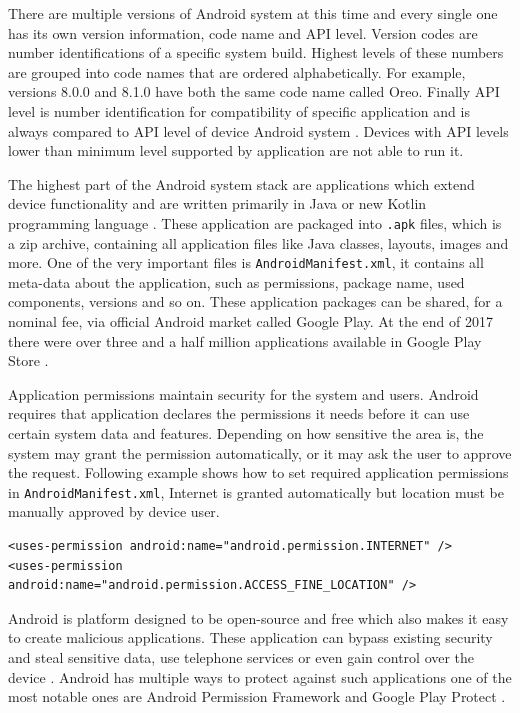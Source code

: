There are multiple versions of Android system at this time and every single one has its own version information, code name and API level. Version codes are number identifications of a specific system build. Highest levels of these numbers are grouped into code names that are ordered alphabetically. For example, versions 8.0.0 and 8.1.0 have both the same code name called Oreo. Finally API level is number identification for compatibility of specific application and is always compared to API level of device Android system \cite{AOSP, AD}. Devices with API levels lower than minimum level supported by application are not able to run it.

The highest part of the Android system stack are applications which extend device functionality and are written primarily in Java or new Kotlin programming language \cite{SoASTaD}. These application are packaged into \verb|.apk| files, which is a zip archive, containing all application files like Java classes, layouts, images and more. One of the very important files is \verb|AndroidManifest.xml|, it contains all meta-data about the application, such as permissions, package name, used components, versions and so on. These application packages can be shared, for a nominal fee, via official Android market called Google Play. At the end of 2017 there were over three and a half million applications available in Google Play Store \cite{SoASTaD, NoAAiGPS, NoAA}.

Application permissions maintain security for the system and users. Android requires that application declares the permissions it needs before it can use certain system data and features. Depending on how sensitive the area is, the system may grant the permission automatically, or it may ask the user to approve the request. Following example shows how to set required application permissions in \verb|AndroidManifest.xml|, Internet is granted automatically but location must be manually approved by device user.

\begin{lstlisting}[caption=Application permission settings]
<uses-permission android:name="android.permission.INTERNET" />
<uses-permission android:name="android.permission.ACCESS_FINE_LOCATION" />
\end{lstlisting}

Android is platform designed to be open-source and free which also makes it easy to create malicious applications. These application can bypass existing security and steal sensitive data, use telephone services or even gain control over the device \cite{ASIMPD}. Android has multiple ways to protect against such applications one of the most notable ones are Android Permission Framework and Google Play Protect \cite{SoASTaD}.

